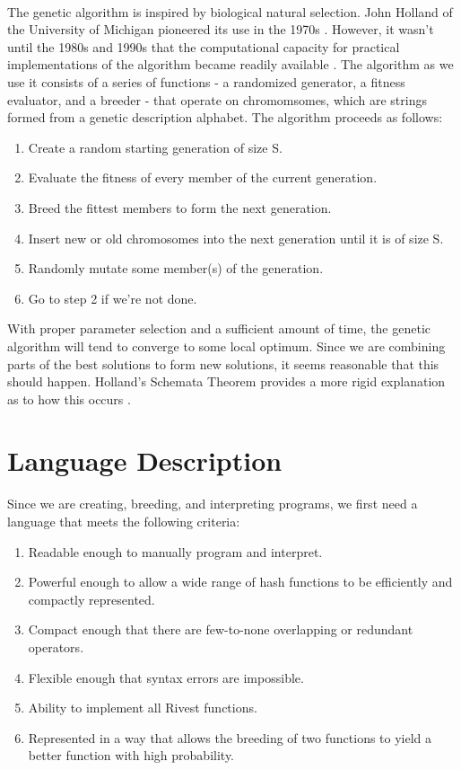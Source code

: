 \documentclass{article}
\begin{document}
\paragraph{}
The genetic algorithm is inspired by biological natural selection. John Holland of the University of Michigan pioneered its use in the 1970s \cite{Holland1973}.
However, it wasn't until the 1980s and 1990s that the computational capacity for practical implementations of the algorithm became readily available \cite{Goldberg}. The algorithm as we use it consists of a series of functions - a randomized generator, a fitness evaluator, and a breeder - that operate on chromomsomes, which are strings formed from a genetic description alphabet. The algorithm proceeds as follows:
\begin{enumerate}
	\item Create a random starting generation of size S.
	\item Evaluate the fitness of every member of the current generation.
	\item Breed the fittest members to form the next generation.
	\item Insert new or old chromosomes into the next generation until it is of size S.
	\item Randomly mutate some member(s) of the generation.
	\item Go to step 2 if we're not done.
\end{enumerate}

With proper parameter selection and a sufficient amount of time, the genetic algorithm will tend to converge to some local optimum. Since we are combining parts of the best solutions to form new solutions, it seems reasonable that this should happen. Holland's Schemata Theorem provides a more rigid explanation as to how this occurs \cite{citeulike:1281572}.

\section{Language Description}
Since we are creating, breeding, and interpreting programs, we first need a language that meets the following criteria:

\begin{enumerate}
\item Readable enough to manually program and interpret.
\item Powerful enough to allow a wide range of hash functions to be efficiently and compactly represented.
\item Compact enough that there are few-to-none overlapping or redundant operators.
\item Flexible enough that syntax errors are impossible.
\item Ability to implement all Rivest functions.
\item Represented in a way that allows the breeding of two functions to yield a better function with high probability.
\end{enumerate}
\end{document}
